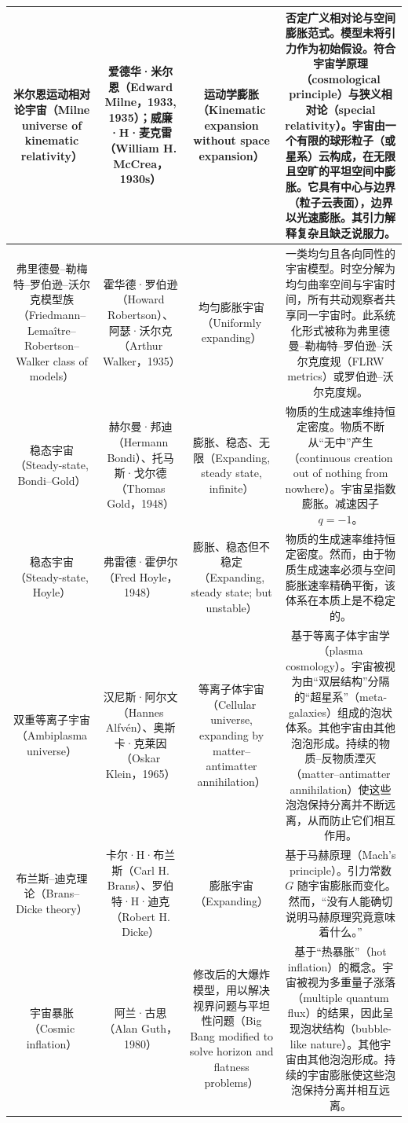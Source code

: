 \begin{table}[ht]
\begin{tabular}{|c|c|c|c|}
\hline
米尔恩运动相对论宇宙（Milne universe of kinematic relativity）& 爱德华·米尔恩（Edward Milne，1933, 1935）；威廉·H·麦克雷（William H. McCrea，1930s） & 运动学膨胀（Kinematic expansion without space expansion）& 否定广义相对论与空间膨胀范式。模型未将引力作为初始假设。符合宇宙学原理（cosmological principle）与狭义相对论（special relativity）。宇宙由一个有限的球形粒子（或星系）云构成，在无限且空旷的平坦空间中膨胀。它具有中心与边界（粒子云表面），边界以光速膨胀。其引力解释复杂且缺乏说服力。\\
\hline
弗里德曼–勒梅特–罗伯逊–沃尔克模型族（Friedmann–Lemaître–Robertson–Walker class of models）& 霍华德·罗伯逊（Howard Robertson）、阿瑟·沃尔克（Arthur Walker，1935）& 均匀膨胀宇宙（Uniformly expanding）& 一类均匀且各向同性的宇宙模型。时空分解为均匀曲率空间与宇宙时间，所有共动观察者共享同一宇宙时。此系统化形式被称为弗里德曼–勒梅特–罗伯逊–沃尔克度规（FLRW metrics）或罗伯逊–沃尔克度规。\\
\hline
稳态宇宙（Steady-state, Bondi–Gold）& 赫尔曼·邦迪（Hermann Bondi）、托马斯·戈尔德（Thomas Gold，1948）& 膨胀、稳态、无限（Expanding, steady state, infinite）& 物质的生成速率维持恒定密度。物质不断从“无中”产生（continuous creation out of nothing from nowhere）。宇宙呈指数膨胀。减速因子 $q = -1$。\\
\hline
稳态宇宙（Steady-state, Hoyle）& 弗雷德·霍伊尔（Fred Hoyle，1948）& 膨胀、稳态但不稳定（Expanding, steady state; but unstable）& 物质的生成速率维持恒定密度。然而，由于物质生成速率必须与空间膨胀速率精确平衡，该体系在本质上是不稳定的。\\
\hline
双重等离子宇宙（Ambiplasma universe）& 汉尼斯·阿尔文（Hannes Alfvén）、奥斯卡·克莱因（Oskar Klein，1965）& 等离子体宇宙（Cellular universe, expanding by matter–antimatter annihilation）& 基于等离子体宇宙学（plasma cosmology）。宇宙被视为由“双层结构”分隔的“超星系”（meta-galaxies）组成的泡状体系。其他宇宙由其他泡泡形成。持续的物质–反物质湮灭（matter–antimatter annihilation）使这些泡泡保持分离并不断远离，从而防止它们相互作用。\\
\hline
布兰斯–迪克理论（Brans–Dicke theory）& 卡尔·H·布兰斯（Carl H. Brans）、罗伯特·H·迪克（Robert H. Dicke）& 膨胀宇宙（Expanding） & 基于马赫原理（Mach's principle）。引力常数 $G$ 随宇宙膨胀而变化。然而，“没有人能确切说明马赫原理究竟意味着什么。”\\
\hline
宇宙暴胀（Cosmic inflation）& 阿兰·古思（Alan Guth，1980）& 修改后的大爆炸模型，用以解决视界问题与平坦性问题（Big Bang modified to solve horizon and flatness problems）& 基于“热暴胀”（hot inflation）的概念。宇宙被视为多重量子涨落（multiple quantum flux）的结果，因此呈现泡状结构（bubble-like nature）。其他宇宙由其他泡泡形成。持续的宇宙膨胀使这些泡泡保持分离并相互远离。\\

\end{tabular}
\end{table}
